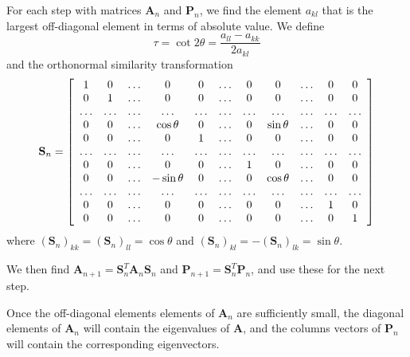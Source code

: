 \documentclass[11pt,a4paper]{article}
\newcommand\V[1]{\mathbf{#1}}                  %
\begin{document}
For each step with matrices $\V{A}_n$ and $\V{P}_n$, we find the element $a_{kl}$ that is the largest off-diagonal element in terms of absolute value. We define
\begin{equation}
  \tau = \cot 2 \theta = \frac{a_{ll} - a_{kk}}{2 a_{kl}}
\end{equation}
and the orthonormal similarity transformation
\begin{equation}
  \V{S}_n = \left[ \begin{array}{*{20}c}
    1 & 0 & \ldots & 0 & 0 & \ldots & 0 & 0 & \ldots & 0 & 0 \\
    0 & 1 & \ldots & 0 & 0 & \ldots & 0 & 0 & \ldots & 0 & 0 \\
    \ldots & \ldots & \ldots & \ldots & \ldots & \ldots & \ldots & \ldots & \ldots & \ldots & \ldots \\
    0 & 0 & \ldots & \cos \theta & 0& \ldots & 0 & \sin \theta & \ldots & 0 & 0 \\
    0 & 0 & \ldots & 0 & 1 & \ldots & 0 & 0 & \ldots & 0 & 0 \\
    \ldots & \ldots & \ldots & \ldots & \ldots & \ldots & \ldots & \ldots & \ldots & \ldots & \ldots \\
    0 & 0 & \ldots & 0 & 0 & \ldots & 1 & 0 & \ldots & 0 & 0 \\
    0 & 0 & \ldots & -\sin\theta & 0 & \ldots & 0 & \cos \theta & \ldots & 0 & 0 \\
    \ldots & \ldots & \ldots & \ldots & \ldots & \ldots & \ldots & \ldots & \ldots & \ldots & \ldots \\
    0 & 0 & \ldots & 0 & 0 & \ldots & 0 & 0 & \ldots & 1 & 0 \\
    0 & 0 & \ldots & 0 & 0 & \ldots & 0 & 0 & \ldots & 0 & 1 \\
  \end{array} \right]
\end{equation}
where $(\V{S}_n)_{kk} = (\V{S}_n)_{ll} = \cos \theta$ and $(\V{S}_n)_{kl} = - (\V{S}_n)_{lk} = \sin \theta$.

We then find $\V{A}_{n+1} = \V{S}_n^T \V{A}_n \V{S}_n$ and $\V{P}_{n+1} = \V{S}_n^T \V{P}_n$, and use these for the next step.

Once the off-diagonal elements elements of $\V{A}_n$ are sufficiently small, the diagonal elements of $\V{A}_n$ will contain the eigenvalues of $\V{A}$, and the columns vectors of $\V{P}_n$ will contain the corresponding eigenvectors.

\subsection{}
\end{document}
